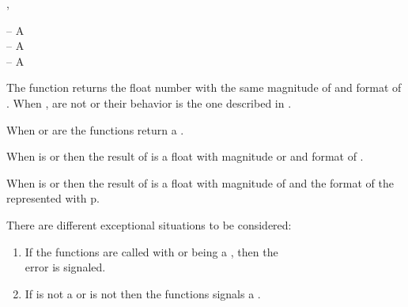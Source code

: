 \documentclass[../Type-Manipulation-Coercion.tex]{subfiles}
\begin{document}

\DSyntax{}

 ,  \RArrow {}

\DArgsNValues{}

 -- A \\
 -- A \\
 -- A \\

\DDescription{}

The function returns the float number  with the same magnitude of
 and format of . When
,  are not  or 
their behavior is the one described in \cite{1996:ANSIHyperSpec}.

\noindent
When  or  are
 the functions return a .

\noindent
When  is  or
 then the result of  is a float
with magnitude  or
 and
format of .

\noindent
When  is  or
 then the result of  is a float
with magnitude of  and the format of the 
represented with p.

\DExceptional{}

There are different exceptional situations to be considered:
\begin{enumerate}
\item If the functions are called with
   or  being a
  , then the\\
   error is signaled.
\item If  is not a \CL{}  or  is
  not \CL{}  then the functions signals a
  .
\end{enumerate}
\end{document}
